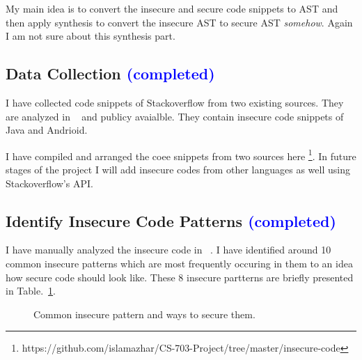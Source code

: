 \documentclass[sigconf]{acmart}
\begin{document}
My main idea is to convert the insecure and secure code snippets to AST and then apply synthesis to convert the insecure AST to secure AST \textit{somehow}. Again I am not sure about this synthesis part.  

\subsection{Data Collection \textcolor{blue}{(completed)}} 
I have collected code snippets of Stackoverflow from two existing sources. They are analyzed in ~\cite{fischer2017stack, meng2018secure} and publicy avaialble. 
They contain insecure code snippets of Java and Andrioid. 

I have compiled and arranged the coee snippets from two sources here \footnote{https://github.com/islamazhar/CS-703-Project/tree/master/insecure-code}. In future stages of the project I will add insecure codes from other languages as well using Stackoverflow's API.

\subsection{Identify Insecure Code Patterns \textcolor{blue}{(completed)}}
I have manually analyzed the insecure code in ~\cite{fischer2017stack,meng2018secure}. I have identified around 10 common insecure patterns which are most frequently occuring in them to an idea how secure code should look like. These 8 insecure partterns are briefly presented in Table.~\ref{tab:insecure-pattern}.

  \begin{figure}[ht]
    \caption{Common insecure pattern and ways to secure them.}
    \label{tab:insecure-pattern}
  \end{figure}
\end{document}
